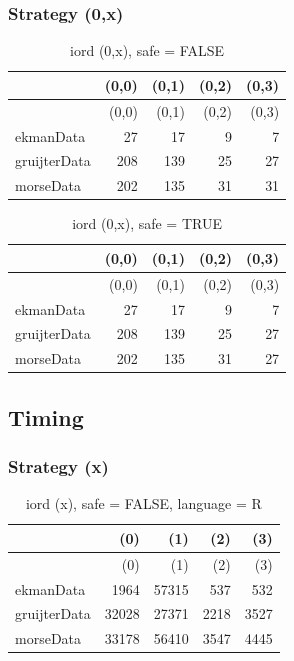 \documentclass[
  12pt,
  letterpaper,
  DIV=11,
  numbers=noendperiod]{scrartcl}
\begin{document}
\subsubsection{Strategy (0,x)}\label{strategy-0x}

\begin{longtable}[]{@{}lrrrr@{}}
\caption{iord (0,x), safe = FALSE}\tabularnewline
\toprule\noalign{}
& (0,0) & (0,1) & (0,2) & (0,3) \\
\midrule\noalign{}
\endfirsthead
\toprule\noalign{}
& (0,0) & (0,1) & (0,2) & (0,3) \\
\midrule\noalign{}
\endhead
\bottomrule\noalign{}
\endlastfoot
ekmanData & 27 & 17 & 9 & 7 \\
gruijterData & 208 & 139 & 25 & 27 \\
morseData & 202 & 135 & 31 & 31 \\
\end{longtable}

\begin{longtable}[]{@{}lrrrr@{}}
\caption{iord (0,x), safe = TRUE}\tabularnewline
\toprule\noalign{}
& (0,0) & (0,1) & (0,2) & (0,3) \\
\midrule\noalign{}
\endfirsthead
\toprule\noalign{}
& (0,0) & (0,1) & (0,2) & (0,3) \\
\midrule\noalign{}
\endhead
\bottomrule\noalign{}
\endlastfoot
ekmanData & 27 & 17 & 9 & 7 \\
gruijterData & 208 & 139 & 25 & 27 \\
morseData & 202 & 135 & 31 & 27 \\
\end{longtable}

\subsection{Timing}\label{timing}

\subsubsection{Strategy (x)}\label{strategy-x-1}

\begin{longtable}[]{@{}lrrrr@{}}
\caption{iord (x), safe = FALSE, language = R}\tabularnewline
\toprule\noalign{}
& (0) & (1) & (2) & (3) \\
\midrule\noalign{}
\endfirsthead
\toprule\noalign{}
& (0) & (1) & (2) & (3) \\
\midrule\noalign{}
\endhead
\bottomrule\noalign{}
\endlastfoot
ekmanData & 1964 & 57315 & 537 & 532 \\
gruijterData & 32028 & 27371 & 2218 & 3527 \\
morseData & 33178 & 56410 & 3547 & 4445 \\
\end{longtable}
\end{document}
